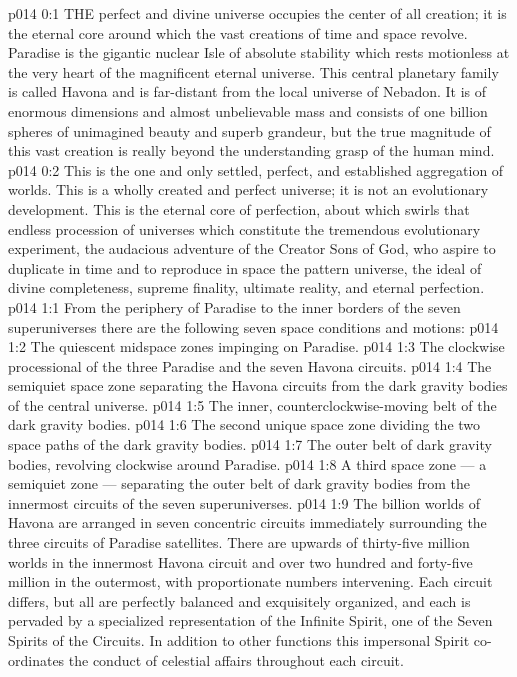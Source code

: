 \vs p014 0:1 THE perfect and divine universe occupies the center of all creation; it is the eternal core around which the vast creations of time and space revolve. Paradise is the gigantic nuclear Isle of absolute stability which rests motionless at the very heart of the magnificent eternal universe. This central planetary family is called Havona and is far\hyp{}distant from the local universe of Nebadon. It is of enormous dimensions and almost unbelievable mass and consists of one billion spheres of unimagined beauty and superb grandeur, but the true magnitude of this vast creation is really beyond the understanding grasp of the human mind.
\vs p014 0:2 This is the one and only settled, perfect, and established aggregation of worlds. This is a wholly created and perfect universe; it is not an evolutionary development. This is the eternal core of perfection, about which swirls that endless procession of universes which constitute the tremendous evolutionary experiment, the audacious adventure of the Creator Sons of God, who aspire to duplicate in time and to reproduce in space the pattern universe, the ideal of divine completeness, supreme finality, ultimate reality, and eternal perfection.
\vs p014 1:1 From the periphery of Paradise to the inner borders of the seven superuniverses there are the following seven space conditions and motions:
\vs p014 1:2 \bibnobreakspace The quiescent midspace zones impinging on Paradise.
\vs p014 1:3 \bibnobreakspace The clockwise processional of the three Paradise and the seven Havona circuits.
\vs p014 1:4 \bibnobreakspace The semiquiet space zone separating the Havona circuits from the dark gravity bodies of the central universe.
\vs p014 1:5 \bibnobreakspace The inner, counterclockwise\hyp{}moving belt of the dark gravity bodies.
\vs p014 1:6 \bibnobreakspace The second unique space zone dividing the two space paths of the dark gravity bodies.
\vs p014 1:7 \bibnobreakspace The outer belt of dark gravity bodies, revolving clockwise around Paradise.
\vs p014 1:8 \bibnobreakspace A third space zone --- a semiquiet zone --- separating the outer belt of dark gravity bodies from the innermost circuits of the seven superuniverses.
\vs p014 1:9 \pc The billion worlds of Havona are arranged in seven concentric circuits immediately surrounding the three circuits of Paradise satellites. There are upwards of thirty\hyp{}five million worlds in the innermost Havona circuit and over two hundred and forty\hyp{}five million in the outermost, with proportionate numbers intervening. Each circuit differs, but all are perfectly balanced and exquisitely organized, and each is pervaded by a specialized representation of the Infinite Spirit, one of the Seven Spirits of the Circuits. In addition to other functions this impersonal Spirit co\hyp{}ordinates the conduct of celestial affairs throughout each circuit.
